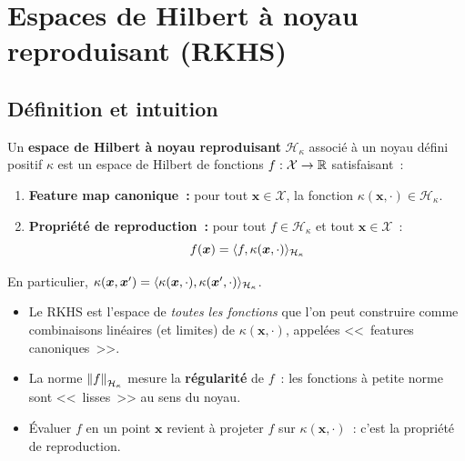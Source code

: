 \section{Espaces de Hilbert \`a noyau reproduisant (RKHS)}
\label{sec:rkhs}

\subsection{D\'efinition et intuition}

\begin{definition}[RKHS]
\label{def:rkhs}
Un \textbf{espace de Hilbert \`a noyau reproduisant} $\mathcal{H}_\kappa$
associ\'e \`a un noyau d\'efini positif $\kappa$ est un espace de Hilbert
de fonctions $f : \mathcal{X} \to \mathbb{R}$ satisfaisant~:
\begin{enumerate}
  \item \textbf{Feature map canonique~:} pour tout $\bm{x} \in \mathcal{X}$,
    la fonction $\kappa(\bm{x}, \cdot) \in \mathcal{H}_\kappa$.
  \item \textbf{Propri\'et\'e de reproduction~:} pour tout
    $f \in \mathcal{H}_\kappa$ et tout $\bm{x} \in \mathcal{X}$~:
    \begin{equation}
      f(\bm{x}) = \langle f, \kappa(\bm{x}, \cdot) \rangle_{\mathcal{H}_\kappa}
      \label{eq:reproducing}
    \end{equation}
\end{enumerate}
En particulier,
$\kappa(\bm{x}, \bm{x}') = \langle \kappa(\bm{x}, \cdot), \kappa(\bm{x}', \cdot) \rangle_{\mathcal{H}_\kappa}$.
\end{definition}

\begin{intuition}[title=\textbf{Interpr\'etation du RKHS}]
\begin{itemize}
  \item Le RKHS est l'espace de \emph{toutes les fonctions} que l'on peut
    construire comme combinaisons lin\'eaires (et limites) de
    $\kappa(\bm{x}, \cdot)$, appel\'ees <<~features canoniques~>>.
  \item La norme $\left\| f \right\|_{\mathcal{H}_\kappa}$ mesure la \textbf{r\'egularit\'e}
    de $f$~: les fonctions \`a petite norme sont <<~lisses~>> au sens du
    noyau.
  \item \'Evaluer $f$ en un point $\bm{x}$ revient \`a projeter $f$ sur
    $\kappa(\bm{x}, \cdot)$~: c'est la propri\'et\'e de reproduction.
\end{itemize}
\end{intuition}


